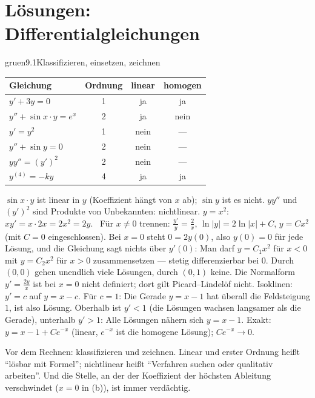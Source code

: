 \chapter[Lösungen: Differentialgleichungen]{Lösungen:\\Differentialgleichungen}

\begin{loesungkarte}{gruen}{9.1}{Klassifizieren, einsetzen, zeichnen}
\begin{center}\small
\begin{tabular}{l|ccc}
Gleichung & Ordnung & linear & homogen\\ \hline
$y' + 3y = 0$ & 1 & ja & ja\\
$y'' + \sin x\cdot y = e^{x}$ & 2 & ja & nein\\
$y' = y^{2}$ & 1 & nein & ---\\
$y'' + \sin y = 0$ & 2 & nein & ---\\
$yy'' = (y')^{2}$ & 2 & nein & ---\\
$y^{(4)} = -ky$ & 4 & ja & ja
\end{tabular}
\end{center}
$\sin x\cdot y$ ist linear in $y$ (Koeffizient hängt von $x$ ab); $\sin y$ ist es nicht. $yy''$ und $(y')^{2}$ sind Produkte von Unbekannten: nichtlinear.
$y = x^{2}$: $xy' = x\cdot2x = 2x^{2} = 2y$. \checkmark\ Für $x\neq0$ trennen: $\frac{y'}y = \frac2x$, $\ln|y| = 2\ln|x| + C$, $y = Cx^{2}$ (mit $C = 0$ eingeschlossen). Bei $x = 0$ steht $0 = 2y(0)$, also $y(0) = 0$ für jede Lösung, und die Gleichung sagt nichts über $y'(0)$: Man darf $y = C_1x^{2}$ für $x < 0$ mit $y = C_2x^{2}$ für $x > 0$ zusammensetzen --- stetig differenzierbar bei $0$. Durch $(0, 0)$ gehen unendlich viele Lösungen, durch $(0, 1)$ keine. Die Normalform $y' = \frac{2y}x$ ist bei $x = 0$ nicht definiert; dort gilt Picard--Lindelöf nicht.
Isoklinen: $y' = c$ auf $y = x - c$. Für $c = 1$: Die Gerade $y = x - 1$ hat überall die Feldsteigung $1$, ist also Lösung. Oberhalb ist $y' < 1$ (die Lösungen wachsen langsamer als die Gerade), unterhalb $y' > 1$: Alle Lösungen nähern sich $y = x - 1$. Exakt: $y = x - 1 + Ce^{-x}$ (linear, $e^{-x}$ ist die homogene Lösung); $Ce^{-x}\to0$. \checkmark
{}
\begin{mitnehmen}\kastentext
Vor dem Rechnen: klassifizieren und zeichnen. Linear und erster Ordnung heißt \enquote{lösbar mit Formel}; nichtlinear heißt \enquote{Verfahren suchen oder qualitativ arbeiten}. Und die Stelle, an der der Koeffizient der höchsten Ableitung verschwindet ($x = 0$ in (b)), ist immer verdächtig.
\end{mitnehmen}
\end{loesungkarte}

